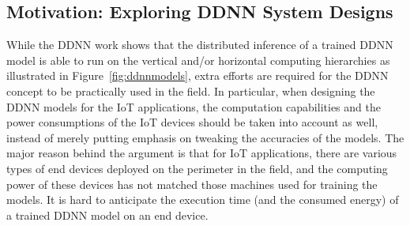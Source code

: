 \documentclass[conference]{IEEEtran}
\def\figurename{Figure}
\begin{document}
\subsection{Motivation: Exploring DDNN System Designs}
\label{sec:motivation}
While the DDNN work \cite{Teerapittayanon17} shows that the distributed inference of a trained DDNN model is able to run on the vertical and/or horizontal computing hierarchies as illustrated in \figurename~\ref{fig:ddnnmodels}, extra efforts are required for the DDNN concept to be practically used in the field. In particular, when designing the DDNN models for the IoT applications, the computation capabilities and the power consumptions of the IoT devices should be taken into account as well, instead of merely putting emphasis on tweaking the accuracies of the models. The major reason behind the argument is that for IoT applications, there are various types of end devices deployed on the perimeter in the field, and the computing power of these devices has not matched those machines used for training the models. It is hard to anticipate the execution time (and the consumed energy) of a trained DDNN model on an end device.

\end{document}
